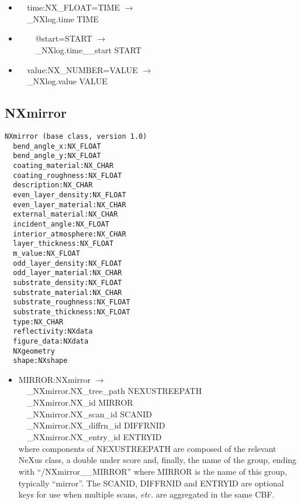 \documentclass[11pt]{article}
\begin{document}
{{\begin{itemize}
\item{\verb|  |time:NX\_FLOAT=TIME $\rightarrow$\\
\verb|  |\_NXlog.time TIME}

\item{\verb|    |@start=START $\rightarrow$\\
\verb|    |\_NXlog.time\_\_start START}

\item{\verb|  |value:NX\_NUMBER=VALUE $\rightarrow$\\
\verb|  |\_NXlog.value VALUE}
\end{itemize}
\subsection{NXmirror}

\begin{verbatim}
NXmirror (base class, version 1.0)
  bend_angle_x:NX_FLOAT
  bend_angle_y:NX_FLOAT
  coating_material:NX_CHAR
  coating_roughness:NX_FLOAT
  description:NX_CHAR
  even_layer_density:NX_FLOAT
  even_layer_material:NX_CHAR
  external_material:NX_CHAR
  incident_angle:NX_FLOAT
  interior_atmosphere:NX_CHAR
  layer_thickness:NX_FLOAT
  m_value:NX_FLOAT
  odd_layer_density:NX_FLOAT
  odd_layer_material:NX_CHAR
  substrate_density:NX_FLOAT
  substrate_material:NX_CHAR
  substrate_roughness:NX_FLOAT
  substrate_thickness:NX_FLOAT
  type:NX_CHAR
  reflectivity:NXdata
  figure_data:NXdata
  NXgeometry
  shape:NXshape
\end{verbatim}

\begin{itemize}

\item{MIRROR:NXmirror $\rightarrow$\\
\verb|  |\_NXmirror.NX\_tree\_path    NEXUSTREEPATH \\
\verb|  |\_NXmirror.NX\_id            MIRROR\\
\verb|  |\_NXmirror.NX\_scan\_id      SCANID \\
\verb|  |\_NXmirror.NX\_diffrn\_id    DIFFRNID \\
\verb|  |\_NXmirror.NX\_entry\_id     ENTRYID \\
where components of NEXUSTREEPATH are composed of the
relevant NeXus class, a double under score and, finally, the
name of the group, ending with ``/NXmirror\_\_MIRROR''
where MIRROR is the name of this group, typically ``mirror''.
The SCANID, DIFFRNID and ENTRYID are optional keys for use
when multiple scans, {\it etc.} are aggregated in the same CBF.}


\end{itemize}}}
\end{document}

